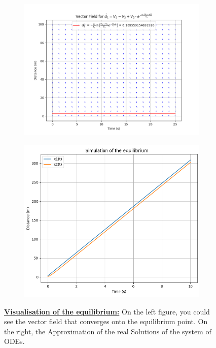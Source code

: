 \documentclass{article}
\begin{document}
	
	\begin{figure}[H]
		\centering
		\begin{subfigure}{0.54\textwidth}
			\centering
			\includegraphics[width=\linewidth]{VectorFIeld.png}
		\end{subfigure}
		\hfill
		\begin{subfigure}{0.44\textwidth}
			\centering
			\includegraphics[width=\linewidth]{RealSolModif.png}
		\end{subfigure}
		\caption[Visualisation of the equilibrium]{\textbf{\underline{Visualisation of the equilibrium:}} On the left figure, you could see the vector field that converges onto the equilibrium point. On the right, the Approximation of the real Solutions of the system of ODEs.}
		\label{fig:SE3}
	\end{figure}
	
\end{document}
